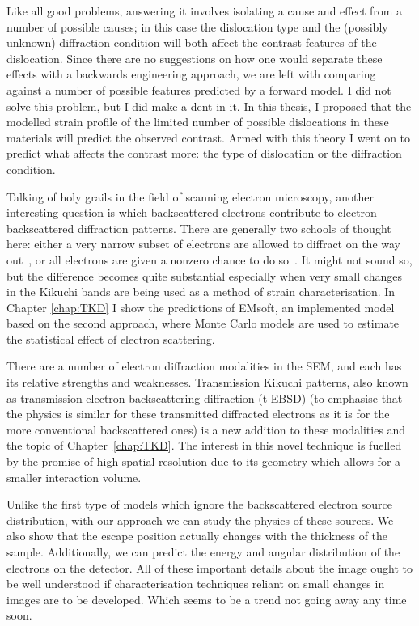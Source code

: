Like all good problems, answering it involves isolating a cause and effect from a number of possible causes; in this case the dislocation type and the (possibly unknown) diffraction condition will both affect the contrast features of the dislocation. Since there are no suggestions on how one would separate these effects with a backwards engineering approach, we are left with comparing against a number of possible features predicted by a forward model. I did not solve this problem, but I did make a dent in it. In this thesis, I proposed that the modelled strain profile of the limited number of possible dislocations in these materials will predict the observed contrast. Armed with this theory I went on to predict what affects the contrast more: the type of dislocation or the diffraction condition. 

Talking of holy grails in the field of scanning electron microscopy, another interesting question is which backscattered electrons contribute to electron backscattered diffraction patterns. There are generally two schools of thought here: either a very narrow subset of electrons are allowed to diffract on the way out~\cite{Winkelmann07}, or all electrons are given a nonzero chance to do so~\cite{degraef2013e}. It might not sound so, but the difference becomes quite substantial especially when very small changes in the Kikuchi bands are being used as a method of strain characterisation. In Chapter \ref{chap:TKD} I show the predictions of \textsf{EMsoft}, an implemented model based on the second approach, where Monte Carlo models are used to estimate the statistical effect of electron scattering. 

There are a number of electron diffraction modalities in the SEM, and each has its relative strengths and weaknesses. Transmission Kikuchi patterns, also known as transmission electron backscattering diffraction (t-EBSD) (to emphasise that the physics is similar for these transmitted diffracted electrons as it is for the more conventional backscattered ones) is a new addition to these modalities and the topic of Chapter~\ref{chap:TKD}. The interest in this novel technique is fuelled by the promise of high spatial resolution due to its geometry which allows for a smaller interaction volume. 

Unlike the first type of models which ignore the backscattered electron source distribution, with our approach we can study the physics of these sources. We also show that the escape position actually changes with the thickness of the sample. Additionally, we can predict the energy and angular distribution of the electrons on the detector. All of these important details about the image ought to be well understood if characterisation techniques reliant on small changes in images are to be developed. Which seems to be a trend not going away any time soon. 




